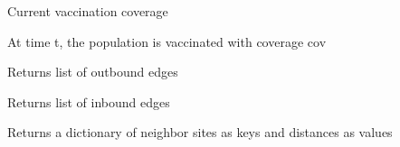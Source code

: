 \documentclass[letterpaper,10pt,english]{sphinxmanual}
\begin{document}
\begin{fulllineitems}
\begin{fulllineitems}
\end{fulllineitems}


\begin{fulllineitems}
\label{\detokenize{scripting:Site.vaccov}}
Current vaccination coverage

\end{fulllineitems}


\begin{fulllineitems}
\label{\detokenize{scripting:Site.vaccinate}}
At time t, the population is vaccinated with coverage cov

\end{fulllineitems}


\begin{fulllineitems}
\label{\detokenize{scripting:Site.getOutEdges}}
Returns list of outbound edges

\end{fulllineitems}


\begin{fulllineitems}
\label{\detokenize{scripting:Site.getInEdges}}
Returns list of inbound edges

\end{fulllineitems}


\begin{fulllineitems}
\label{\detokenize{scripting:Site.getNeighbors}}
Returns a dictionary of neighbor sites as keys and distances as values

\end{fulllineitems}


\end{fulllineitems}
\end{document}
